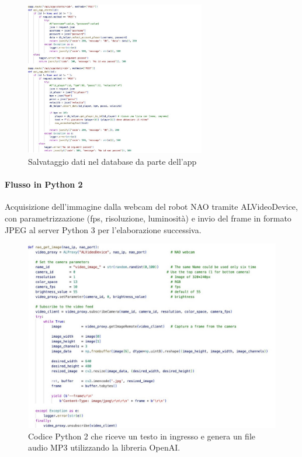 \documentclass{optica-article}
\begin{document}
\FloatBarrier

\begin{figure}[h]
\centering
\includegraphics[width=0.7\textwidth]{figures/py3_2.jpeg}
\caption{Salvataggio dati nel database da parte dell'app}
\label{fig:py3_2}
\end{figure}


\FloatBarrier

\paragraph{Flusso in Python 2}
Acquisizione dell’immagine dalla webcam del robot NAO tramite ALVideoDevice, con parametrizzazione (fps, risoluzione, luminosità) e invio del frame in formato JPEG al server Python 3 per l’elaborazione successiva.

\begin{figure}[h]
\centering
\includegraphics[width=\textwidth]{figures/py3_1.jpeg}
\caption{Codice Python 2 che riceve un testo in ingresso e genera un file audio MP3 utilizzando la libreria OpenAI.}
\label{fig:py2}
\end{figure}
\FloatBarrier
\end{document}
